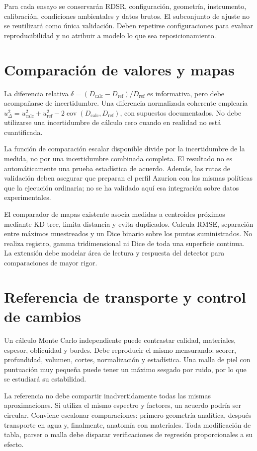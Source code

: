 Para cada ensayo se conservarán RDSR, configuración, geometría, instrumento, calibración, condiciones ambientales y datos brutos. El subconjunto de ajuste no se reutilizará como única validación. Deben repetirse configuraciones para evaluar reproducibilidad y no atribuir a modelo lo que sea reposicionamiento.

\section{Comparación de valores y mapas}
La diferencia relativa $\delta=(D_{\mathrm{calc}}-D_{\mathrm{ref}})/D_{\mathrm{ref}}$ es informativa, pero debe acompañarse de incertidumbre. Una diferencia normalizada coherente emplearía $u_\Delta^2=u_{\mathrm{calc}}^2+u_{\mathrm{ref}}^2-2\operatorname{cov}(D_{\mathrm{calc}},D_{\mathrm{ref}})$, con supuestos documentados. No debe utilizarse una incertidumbre de cálculo cero cuando en realidad no está cuantificada.

La función de comparación escalar disponible divide por la incertidumbre de la medida, no por una incertidumbre combinada completa. El resultado no es automáticamente una prueba estadística de acuerdo. Además, las rutas de validación deben asegurar que preparan el perfil Azurion con las mismas políticas que la ejecución ordinaria; no se ha validado aquí esa integración sobre datos experimentales.

El comparador de mapas existente asocia medidas a centroides próximos mediante KD-tree, limita distancia y evita duplicados. Calcula RMSE, separación entre máximos muestreados y un Dice binario sobre los puntos suministrados. No realiza registro, gamma tridimensional ni Dice de toda una superficie continua. La extensión debe modelar área de lectura y respuesta del detector para comparaciones de mayor rigor.

\section{Referencia de transporte y control de cambios}
Un cálculo Monte Carlo independiente puede contrastar calidad, materiales, espesor, oblicuidad y bordes. Debe reproducir el mismo mensurando: scorer, profundidad, volumen, cortes, normalización y estadística. Una malla de piel con puntuación muy pequeña puede tener un máximo sesgado por ruido, por lo que se estudiará su estabilidad.

La referencia no debe compartir inadvertidamente todas las mismas aproximaciones. Si utiliza el mismo espectro y factores, un acuerdo podría ser circular. Conviene escalonar comparaciones: primero geometría analítica, después transporte en agua y, finalmente, anatomía con materiales. Toda modificación de tabla, parser o malla debe disparar verificaciones de regresión proporcionales a su efecto.
\FloatBarrier
